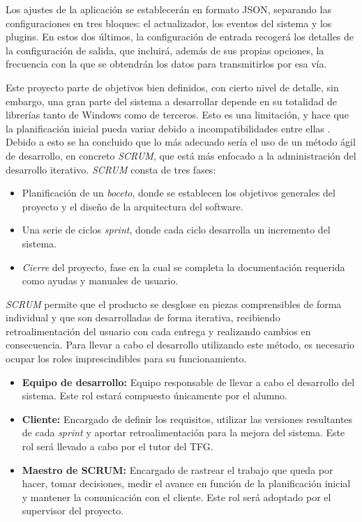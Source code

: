 Los ajustes de la aplicación se establecerán en formato JSON, separando las configuraciones en tres bloques: el actualizador, los eventos del sistema y los plugins. En estos dos últimos, la configuración de entrada recogerá los detalles de la configuración de salida, que incluirá, además de sus propias opciones, la frecuencia con la que se obtendrán los datos para transmitirlos por esa vía.

Este proyecto parte de objetivos bien definidos, con cierto nivel de detalle, sin embargo, una gran parte del sistema a desarrollar depende en su totalidad de librerías tanto de Windows como de terceros. Esto es una limitación, y hace que la planificación inicial pueda variar debido a incompatibilidades entre ellas . Debido a esto se ha concluido que lo más adecuado sería el uso de un método ágil de desarrollo, en concreto \textit{SCRUM}, que está más enfocado a la administración del desarrollo iterativo. \textit{SCRUM} consta de tres fases:
    
    \begin{itemize}
        \item Planificación de un \textit{boceto}, donde se establecen los objetivos generales del proyecto y el diseño de la arquitectura del software.
        \item Una serie de ciclos \textit{sprint}, donde cada ciclo desarrolla un incremento del sistema.
        \item \textit{Cierre} del proyecto, fase en la cual se completa la documentación requerida como ayudas y manuales de usuario.
    \end{itemize}

    \textit{SCRUM} permite que el producto se desglose en piezas comprensibles de forma individual y que son desarrolladas de forma iterativa, recibiendo retroalimentación del usuario con cada entrega y realizando cambios en consecuencia. Para llevar a cabo el desarrollo utilizando este método, es necesario ocupar los roles imprescindibles para su funcionamiento.

    \begin{itemize}
        \item \textbf{Equipo de desarrollo:} Equipo responsable de llevar a cabo el desarrollo del sistema. Este rol estará compuesto únicamente por el alumno.
        \item \textbf{Cliente:} Encargado de definir los requisitos, utilizar las versiones resultantes de cada \textit{sprint} y aportar retroalimentación para la mejora del sistema. Este rol será llevado a cabo por el tutor del TFG.
        \item \textbf{Maestro de SCRUM:} Encargado de rastrear el trabajo que queda por hacer, tomar decisiones, medir el avance en función de la planificación inicial y mantener la comunicación con el cliente. Este rol será adoptado por el supervisor del proyecto.
    \end{itemize}


